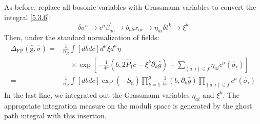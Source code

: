 As before, replace all bosonic variables with Grassmann variables to convert the integral \eqref{5.3.6}:
\begin{subequations}
	\begin{equation}
		\delta \sigma^{a}  \rightarrow c^{a} 
	\end{equation}
	\begin{equation}
		\beta_{a b}^{\prime}  \rightarrow b_{a b} 
	\end{equation}
	\begin{equation}
		x_{a i}  \rightarrow \eta_{a i} 
	\end{equation}
	\begin{equation}
		\delta t^{k}  \rightarrow \xi^{k}
	\end{equation}
\end{subequations}
Then, under the standard normalization of fields:
\begin{equation}
	\begin{aligned}
		\Delta_{\mathrm{FP}}(\hat{\mathrm{g}}, \hat{\sigma})=& \frac{1}{n_{R}} \int[d b d c] d^{\mu} \xi d^{\kappa} \eta \\
		&\quad \times \exp \left[-\frac{1}{4 \pi}\left(b, 2 \hat{P}_{1} c-\xi^{k} \partial_{k} \hat{g}\right)+\sum_{(a, i) \in f} \eta_{a i} c^{a}\left(\hat{\sigma}_{i}\right)\right] \\
		=& \frac{1}{n_{R}} \int[d b d c] \exp \left(-S_{\mathrm{g}}\right) \prod_{k=1}^{\mu} \frac{1}{4 \pi}\left(b, \partial_{k} \hat{g}\right) \prod_{(a, i) \in f} c^{a}\left(\hat{\sigma}_{i}\right)
	\end{aligned}\label{5.3.8}
\end{equation}
In the last line, we integrated out the Grassmann variables $\eta_{ai}$ and $\xi^k$. The appropriate integration measure on the moduli space is generated by the ghost path integral with this insertion.
